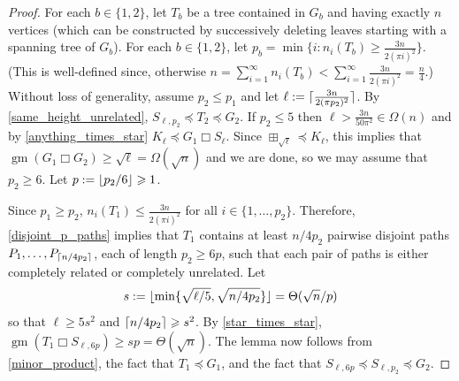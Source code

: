 \documentclass{patmorin}
\newcommand{\boxprod}{\mathbin{\Box}}
\DeclarePairedDelimiter{\floor}{\lfloor}{\rfloor}
\DeclarePairedDelimiter{\ceil}{\lceil}{\rceil}
\renewcommand{\ge}{\geqslant}
\renewcommand{\le}{\leqslant}
\DeclareMathOperator{\gm}{gm}
\theoremstyle{plain}
\theoremstyle{definition}
\begin{document}
\begin{proof}
  For each $b\in\{1,2\}$, let $T_b$ be a tree contained in $G_b$ and having exactly $n$ vertices (which can be constructed by successively deleting leaves starting with a spanning tree of $G_b$).  
  For each $b\in\{1,2\}$, let $p_b=\min\{i: n_i(T_b)\ge \tfrac{3n}{2(\pi i)^2}\}$.  (This is well-defined since, otherwise $n=\sum_{i=1}^\infty n_i(T_b) < \sum_{i=1}^\infty \tfrac{3n}{2(\pi i)^2} = \frac{n}{4}$.)  Without loss of generality, assume $p_2 \le p_1$ and let $\ell:=\ceil{\tfrac{3n}{2(\pi p_2)^2}}$. By \cref{same_height_unrelated}, $S_{\ell,p_2}\preceq T_2\preceq G_2$.  If $p_2 \le 5$ then $\ell > \frac{3n}{50\pi^2}\in\Omega(n)$ and by \cref{anything_times_star} $K_{\ell}\preceq G_1 \boxprod S_\ell$.
  Since $\boxplus_{\sqrt{\ell}}\preceq K_{\ell}$, this implies that $\gm(G_1\boxprod G_2)\ge \sqrt{\ell}=\Omega(\sqrt{n})$ and we are done, so we may assume that $p_2\ge 6$. Let $p:=\floor{p_2/6}\ge 1$.

  Since $p_1\ge p_2$, $n_i(T_1)\le \tfrac{3n}{2(\pi i)^2}$ for all $i\in\{1,\ldots,p_2\}$.  Therefore, \cref{disjoint_p_paths} implies that $T_1$ contains at least $n/4p_2$ pairwise disjoint paths $P_1,\ldots,P_{\ceil{n/4p_2}}$, each of length $p_2\ge 6p$, such that each pair of paths is either completely related or completely unrelated.  Let
  \[
    s:=\floor{\min\{\sqrt{\ell/5}, \sqrt{n/4p_2}\}} = \Theta(\sqrt{n}/p)
  \]
  so that $\ell \ge 5s^2$ and $\ceil{n/4p_2}\ge s^2$.  By \cref{star_times_star}, $\gm(T_1 \boxprod S_{\ell,6p}) \ge sp=\Theta(\sqrt{n})$.  The lemma now follows from \cref{minor_product}, the fact that $T_1\preceq G_1$, and the fact that $S_{\ell,6p}\preceq S_{\ell,p_2}\preceq G_2$.
\end{proof}
\end{document}
